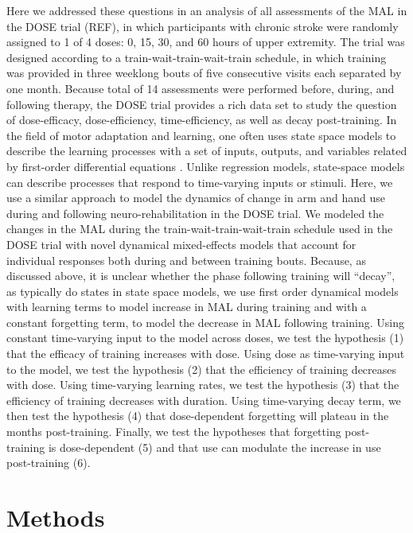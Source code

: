 Here we addressed these questions in an analysis of all assessments of the MAL in the DOSE trial (REF), in which participants with chronic stroke were randomly assigned to 1 of 4 doses: 0, 15, 30, and 60 hours of upper extremity.
The trial was designed according to a train-wait-train-wait-train schedule, in which training was provided in three weeklong bouts of five consecutive visits each separated by one month. 
Because total of 14 assessments were performed before, during, and following therapy, the DOSE trial provides a rich data set to study the question of dose-efficacy, dose-efficiency, time-efficiency, as well as decay post-training. 
In the field of motor adaptation and learning, one often uses state space models to describe the learning processes with a set of inputs, outputs, and variables related by first-order differential equations \cite{Smith2006, Lee2009}. 
Unlike regression models, state-space models can describe processes that respond to time-varying inputs or stimuli. 
Here, we use a similar approach to model the dynamics of change in arm and hand use during and following neuro-rehabilitation in the DOSE trial. 
We modeled the changes in the MAL during the train-wait-train-wait-train schedule used in the DOSE trial with novel dynamical mixed-effects models that account for individual responses both during and between training bouts. 
Because, as discussed above, it is unclear whether the phase following training will “decay”, as typically do states in state space models, we use first order dynamical models with learning terms to model increase in MAL during training and with a constant forgetting term, to model the decrease in MAL following training. 
Using constant time-varying input to the model across doses, we test the hypothesis (1) that the efficacy of training increases with dose. 
Using dose as time-varying input to the model, we test the hypothesis (2) that the efficiency of training decreases with dose. 
Using time-varying learning rates, we test the hypothesis (3) that the efficiency of training decreases with duration. 
Using time-varying decay term, we then test the hypothesis (4) that dose-dependent forgetting will plateau in the months post-training. 
Finally, we test the hypotheses that forgetting post-training is dose-dependent (5) and that use can modulate the increase in use post-training (6). 



\section{Methods}

